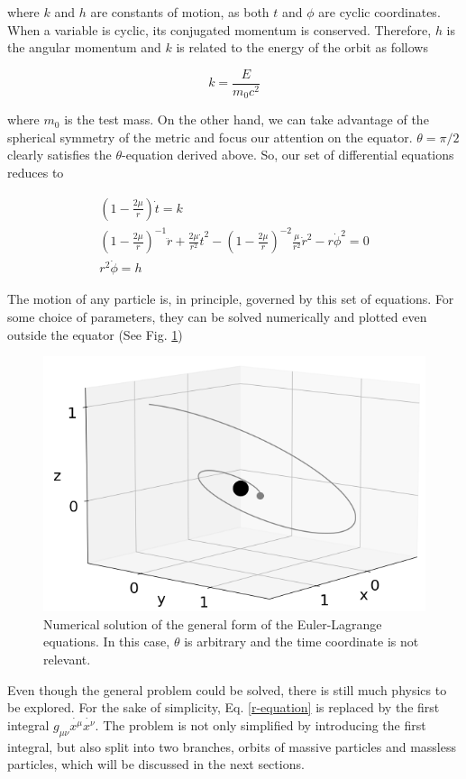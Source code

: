 \documentclass[letterpaper,11pt,onecolumn]{article}
\begin{document}
where $k$ and $h$ are constants of motion, as both $t$ and $\phi$ are cyclic coordinates. When a variable is cyclic, its conjugated momentum is conserved. Therefore, $h$ is the angular momentum and  $k$ is related to the energy of the orbit as follows

\begin{equation}
    k = \frac{E}{m_0 c^2}
\end{equation}

where $m_0$ is the test mass. On the other hand, we can take advantage of the spherical symmetry of the metric and focus our attention on the equator. $\theta = \pi / 2$ clearly satisfies the $\theta$-equation derived above. So, our set of differential equations reduces to 

    \begin{eqnarray}
        \left( 1 - \frac{2 \mu}{r} \right) \dot{t} = k \label{t-equation} \\
        \left( 1 - \frac{2 \mu}{r} \right)^{-1} \ddot{r} + \frac{2\mu}{r^2} \dot{t}^2 - \left( 1 - \frac{2 \mu}{r} \right)^{-2} \frac{\mu}{r^2} \dot{r}^2 - r\dot{\phi}^2  = 0 \label{r-equation} \\
        r^2 \dot{\phi} = h \label{phi-equation}
    \end{eqnarray}

The motion of any particle is, in principle, governed by this set of equations. For some choice of parameters, they can be solved numerically and plotted even outside the equator (See Fig. \ref{fig:general_orbit})

\begin{figure}[h!]
    \centering
    \includegraphics[width=0.6\linewidth]{Presentations/Images/2_gen_obit1.png}
    \caption{Numerical solution of the general form of the Euler-Lagrange equations. In this case, $\theta$ is arbitrary and the time coordinate is not relevant.}
    \label{fig:general_orbit}
\end{figure}

Even though the general problem could be solved, there is still much physics to be explored. For the sake of simplicity, Eq. \ref{r-equation} is replaced by the first integral $g_{\mu \nu} \dot{x^\mu} \dot{x^\nu}$. The problem is not only simplified by introducing the first integral, but also split into two branches, orbits of massive particles and massless particles, which will be discussed in the next sections.
\end{document}
